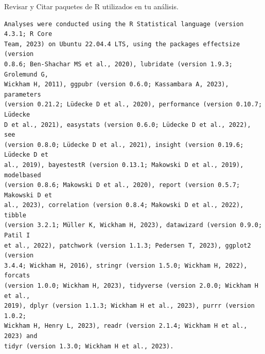 \documentclass[
  10pt]{article}
\begin{document}
\begin{tcolorbox}[enhanced jigsaw, breakable, leftrule=.75mm, toprule=.15mm, colback=white, rightrule=.15mm, bottomrule=.15mm, opacityback=0, arc=.35mm, left=2mm, colframe=quarto-callout-color-frame]

Revisar y Citar paquetes de R utilizados en tu análisis.

\begin{verbatim}
Analyses were conducted using the R Statistical language (version 4.3.1; R Core
Team, 2023) on Ubuntu 22.04.4 LTS, using the packages effectsize (version
0.8.6; Ben-Shachar MS et al., 2020), lubridate (version 1.9.3; Grolemund G,
Wickham H, 2011), ggpubr (version 0.6.0; Kassambara A, 2023), parameters
(version 0.21.2; Lüdecke D et al., 2020), performance (version 0.10.7; Lüdecke
D et al., 2021), easystats (version 0.6.0; Lüdecke D et al., 2022), see
(version 0.8.0; Lüdecke D et al., 2021), insight (version 0.19.6; Lüdecke D et
al., 2019), bayestestR (version 0.13.1; Makowski D et al., 2019), modelbased
(version 0.8.6; Makowski D et al., 2020), report (version 0.5.7; Makowski D et
al., 2023), correlation (version 0.8.4; Makowski D et al., 2022), tibble
(version 3.2.1; Müller K, Wickham H, 2023), datawizard (version 0.9.0; Patil I
et al., 2022), patchwork (version 1.1.3; Pedersen T, 2023), ggplot2 (version
3.4.4; Wickham H, 2016), stringr (version 1.5.0; Wickham H, 2022), forcats
(version 1.0.0; Wickham H, 2023), tidyverse (version 2.0.0; Wickham H et al.,
2019), dplyr (version 1.1.3; Wickham H et al., 2023), purrr (version 1.0.2;
Wickham H, Henry L, 2023), readr (version 2.1.4; Wickham H et al., 2023) and
tidyr (version 1.3.0; Wickham H et al., 2023).


\end{verbatim}
\end{tcolorbox}
\end{document}
